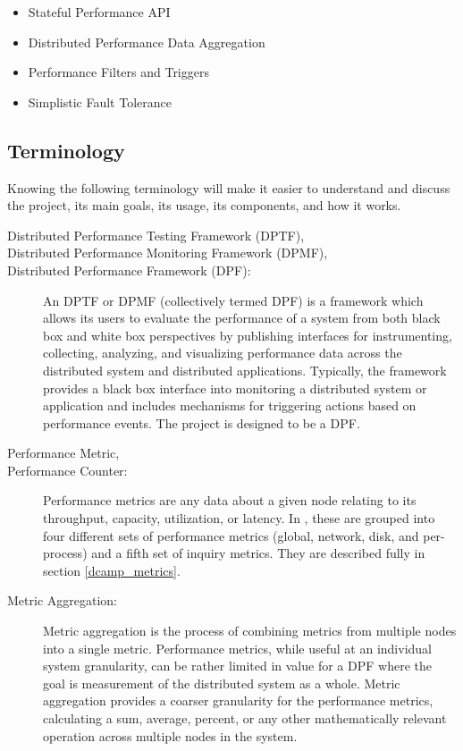 \begin{itemize}
\item Stateful Performance API
\item Distributed Performance Data Aggregation
\item Performance Filters and Triggers
\item Simplistic Fault Tolerance
\end{itemize}

\subsection{Terminology}
Knowing the following terminology will make it easier to understand and discuss the \dcamp project, its main goals, its
usage, its components, and how it works. 

\begin{description}

\item[Distributed Performance Testing Framework (DPTF),]
\item[Distributed Performance Monitoring Framework (DPMF),]
\item[Distributed Performance Framework (DPF):]

An DPTF or DPMF (collectively termed DPF) is a framework which allows its users to evaluate the performance of a system
from both black box and white box perspectives by publishing interfaces for instrumenting, collecting, analyzing, and
visualizing performance data across the distributed system and distributed applications. Typically, the framework
provides a black box interface into monitoring a distributed system or application and includes mechanisms for
triggering actions based on performance events. The \dcamp project is designed to be a DPF. 

\item[Performance Metric,]
\item[Performance Counter:]
Performance metrics are any data about a given node relating to its throughput, capacity, utilization, or latency. In
\dcamp, these are grouped into four different sets of performance metrics (global, network, disk, and per-process) and a
fifth set of inquiry metrics. They are described fully in section \ref{dcamp_metrics}. 

\item[Metric Aggregation:]
Metric aggregation is the process of combining metrics from multiple nodes into a single metric. Performance metrics,
while useful at an individual system granularity, can be rather limited in value for a DPF where the goal is measurement
of the distributed system as a whole. Metric aggregation provides a coarser granularity for the performance metrics,
calculating a sum, average, percent, or any other mathematically relevant operation across multiple nodes in the system. 


\end{description}
